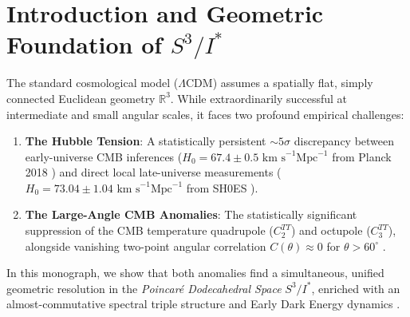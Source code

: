 \documentclass[11pt,a4paper]{article}
\theoremstyle{definition}
\newcommand{\R}{\mathbb{R}}
\newcommand{\PDS}{S^3 / I^*}
\begin{document}
\tableofcontents
\newpage

\section{Introduction and Geometric Foundation of $S^3/I^*$}
\label{sec:intro}

The standard cosmological model ($\Lambda\mathrm{CDM}$) assumes a spatially flat, simply connected Euclidean geometry $\R^3$. While extraordinarily successful at intermediate and small angular scales, it faces two profound empirical challenges:
\begin{enumerate}
    \item \textbf{The Hubble Tension}: A statistically persistent $\sim 5\sigma$ discrepancy between early-universe CMB inferences ($H_0 = 67.4 \pm 0.5\text{ km s}^{-1}\text{Mpc}^{-1}$ from Planck 2018 \cite{Planck2018Params}) and direct local late-universe measurements ($H_0 = 73.04 \pm 1.04\text{ km s}^{-1}\text{Mpc}^{-1}$ from SH0ES \cite{Riess2022}).
    \item \textbf{The Large-Angle CMB Anomalies}: The statistically significant suppression of the CMB temperature quadrupole ($C_2^{TT}$) and octupole ($C_3^{TT}$), alongside vanishing two-point angular correlation $C(\theta) \approx 0$ for $\theta > 60^\circ$ \cite{Luminet2003,Planck2018Topology}.
\end{enumerate}

In this monograph, we show that both anomalies find a simultaneous, unified geometric resolution in the \emph{Poincar\'e Dodecahedral Space} $\PDS$, enriched with an almost-commutative spectral triple structure \cite{Chamseddine1996,Chamseddine2007,vanSuijlekom2015} and Early Dark Energy dynamics \cite{Poulin2019,Kamionkowski2023}.
\end{document}
